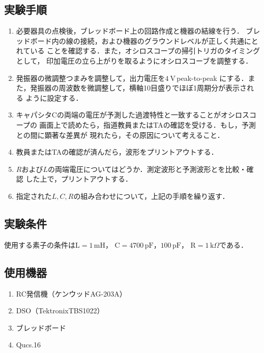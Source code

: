 \subsection{実験手順}    
    \begin{enumerate}
        \item 必要器具の点検後，ブレッドボード上の回路作成と機器の結線を行う．
        ブレッドボード内の線の接続，およひ機器のグラウンドレベルが正しく共通にとれている
        ことを確認する．また，オシロスコープの掃引トリガのタイミングとして，
        印加電圧の立ら上がりを取るようにオシロスコーブを調整する．

        \item  発振器の微調整つまみを調整して，出力電圧を$4 \mathrm{~V}$\,peak-to-peak
        にする．また，発振器の周波数を微調整して，横軸10目盛りでほぼ1周期分が表示される
        ように設定する．

        \item キャパシタCの両端の電圧が予測した過渡特性と一致することがオシロスコープの
        画面上で読めたら，指道教員またはTAの確認を受ける．もし，予測との間に顕著な差異が
        現れたら，その原因について考えること．

        \item 教員またはTAの確認が済んだら，波形をプリントアウトする．

        \item $R$および$L$の両端電圧についてはどうか．測定波形と予測波形とを比較・確認
        した上で，プリントアウトする．

        \item 指定された$L, C, R$の組み合わせについて，上記の手順を繰り返す．
    \end{enumerate}

\newpage

\subsection{実験条件}
使用する素子の条件は$\mathrm{L}=1\,\mathrm{mH}$，
$\mathrm{C}=4700\,\mathrm{pF}，100\,\mathrm{pF}$，
$\mathrm{R}=1\,\mathrm{k}\Omega$である．

\subsection{使用機器}
\begin{enumerate}
    \item RC発信機（ケンウッド\quad AG-203A）
    \item DSO（Tektronix\quad TBS1022）
    \item ブレッドボード
    \item Qucs.16
\end{enumerate}

